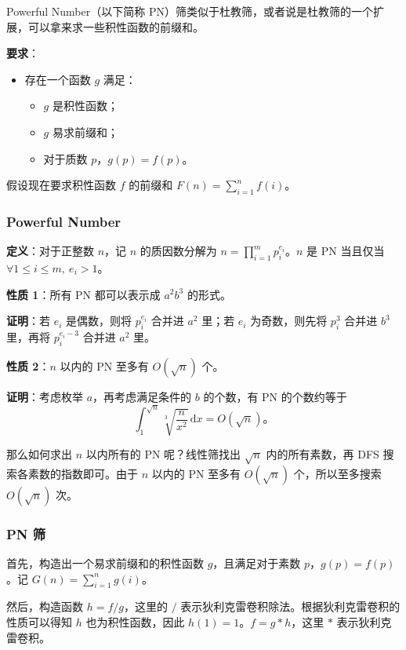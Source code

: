 Powerful Number（以下简称 PN）筛类似于杜教筛，或者说是杜教筛的一个扩展，可以拿来求一些积性函数的前缀和。

\textbf{要求}：
\begin{itemize}
    \item 存在一个函数 $g$ 满足：
    \begin{itemize}
        \item $g$ 是积性函数；
        \item $g$ 易求前缀和；
        \item 对于质数 $p$，$g(p) = f(p)$。
    \end{itemize}
\end{itemize}

假设现在要求积性函数 $f$ 的前缀和 $F(n) = \sum_{i=1}^{n} f(i)$。

\subsubsection{Powerful Number}

\textbf{定义}：对于正整数 $n$，记 $n$ 的质因数分解为 $n = \prod_{i=1}^{m} p_i^{e_i}$。$n$ 是 PN 当且仅当 $\forall 1 \le i \le m,\ e_i > 1$。

\textbf{性质 1}：所有 PN 都可以表示成 $a^{2}b^{3}$ 的形式。

\textbf{证明}：若 $e_i$ 是偶数，则将 $p_i^{e_i}$ 合并进 $a^{2}$ 里；若 $e_i$ 为奇数，则先将 $p_i^{3}$ 合并进 $b^{3}$ 里，再将 $p_i^{e_i-3}$ 合并进 $a^{2}$ 里。

\textbf{性质 2}：$n$ 以内的 PN 至多有 $O(\sqrt{n})$ 个。

\textbf{证明}：考虑枚举 $a$，再考虑满足条件的 $b$ 的个数，有 PN 的个数约等于
\[
\int_{1}^{\sqrt{n}} \sqrt[3]{\frac{n}{x^2}} \,\mathrm{d}x = O(\sqrt{n})。
\]

那么如何求出 $n$ 以内所有的 PN 呢？线性筛找出 $\sqrt{n}$ 内的所有素数，再 DFS 搜索各素数的指数即可。由于 $n$ 以内的 PN 至多有 $O(\sqrt{n})$ 个，所以至多搜索 $O(\sqrt{n})$ 次。

\subsubsection{PN 筛}

首先，构造出一个易求前缀和的积性函数 $g$，且满足对于素数 $p$，$g(p) = f(p)$。记 $G(n) = \sum_{i=1}^{n} g(i)$。

然后，构造函数 $h = f / g$，这里的 $/$ 表示狄利克雷卷积除法。根据狄利克雷卷积的性质可以得知 $h$ 也为积性函数，因此 $h(1) = 1$。$f = g * h$，这里 $*$ 表示狄利克雷卷积。

